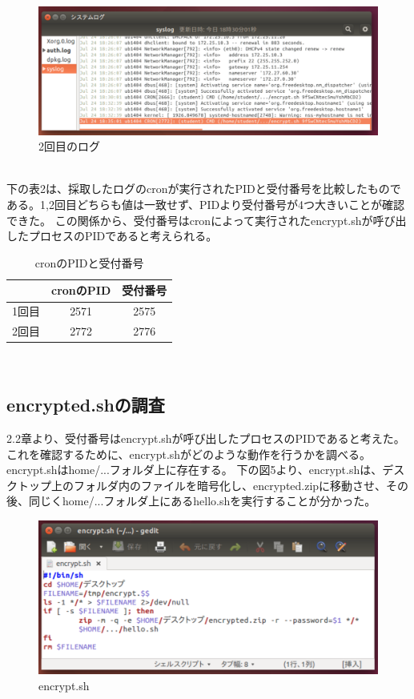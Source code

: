 \documentclass[dvipdfmx,autodetect-engine,titlepage]{jsarticle}
\begin{document}
\begin{figure}[H]
  \centering
  \includegraphics[scale=0.5]{in5.png}
  \caption{2回目のログ}\label{fig:図5}
\end{figure}

　\\
下の表2は、採取したログのcronが実行されたPIDと受付番号を比較したものである。1,2回目どちらも値は一致せず、PIDより受付番号が4つ大きいことが確認できた。
この関係から、受付番号はcronによって実行されたencrypt.shが呼び出したプロセスのPIDであると考えられる。\\
\begin{table}[H]
  \centering
  \caption{cronのPIDと受付番号}
  \begin{tabular}{|c|c|c|}
  \hline
      & cronのPID & 受付番号 \\ \hline
  1回目 & 2571     & 2575 \\ \hline
  2回目 & 2772     & 2776 \\ \hline
  \end{tabular}
\end{table}
　
\subsection{encrypted.shの調査}
2.2章より、受付番号はencrypt.shが呼び出したプロセスのPIDであると考えた。これを確認するために、encrypt.shがどのような動作を行うかを調べる。encrypt.shはhome/...フォルダ上に存在する。
下の図5より、encrypt.shは、デスクトップ上のフォルダ内のファイルを暗号化し、encrypted.zipに移動させ、その後、同じくhome/...フォルダ上にあるhello.shを実行することが分かった。

\begin{figure}[H]
  \centering
  \includegraphics[scale=0.45]{in7.png}
  \caption{encrypt.sh}\label{fig:図7}
\end{figure}
\end{document}
